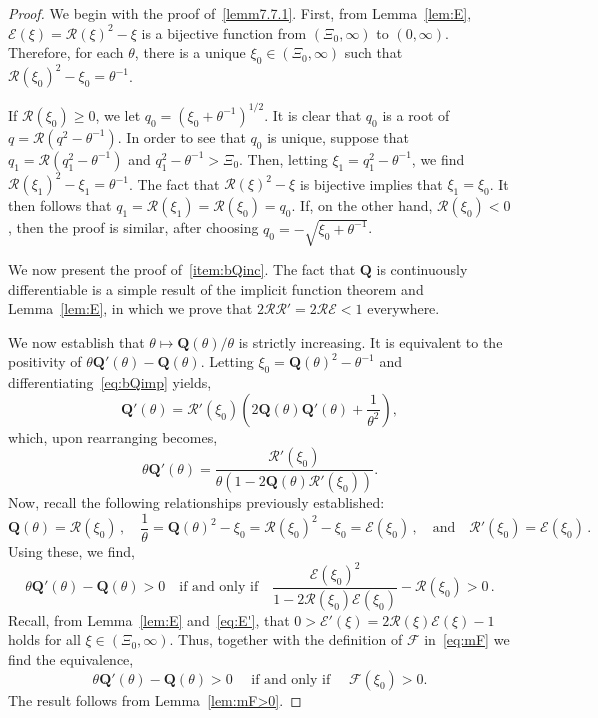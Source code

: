 \documentclass[10pt]{amsart}
\theoremstyle{definition}\newtheorem{defi}[theo]{Definition}\newtheorem{rema}[theo]{Remark}\newtheorem{exam}[theo]{Example}\newtheorem{exem}[theo]{Example}\newtheorem{nota}[theo]{Notation}
\newcommand{\bQ}{\mathbf{Q}}
\newcommand{\mE}{\mathcal{E}}
\newcommand{\mF}{\mathcal{F}}
\newcommand{\mR}{\mathcal{R}}
\newcommand{\1}{\mathds{1}}
\begin{document}
\begin{proof}
We begin with the proof of~\eqref{lemm7.7.1}. First, from Lemma~\ref{lem:E}, $\mE(\xi) = \mR(\xi)^2 - \xi$ is a bijective function from $(\Xi_0,\infty)$ to $(0,\infty)$. Therefore, for each $\theta$, there is a unique $\xi_0 \in (\Xi_0, \infty)$ such that $\mR(\xi_0)^2 - \xi_0 = \theta^{-1}$.

If $\mR(\xi_0) \geq 0$, we let $q_0 = \left (\xi_0 + \theta^{-1}\right) ^{1/2}$. It is clear that $q_0$ is a root of $q = \mR\left (q^2 - \theta^{-1}\right)$. In order to see that $q_0$ is unique, suppose that $q_1 = \mR(q_1^2 - \theta^{-1})$ and $q_1^2 - \theta^{-1}> \Xi_0$. Then, letting $\xi_1 = q_1^2 - \theta^{-1}$, we find $\mR(\xi_1)^2 - \xi_1 = \theta^{-1}$. The fact that $\mR(\xi)^2 - \xi$ is bijective implies that $\xi_1 = \xi_0$. It then follows that $q_1 = \mR(\xi_1) = \mR(\xi_0) = q_0$. If, on the other hand, $\mR(\xi_0) < 0$, then the proof is similar, after choosing $q_0 = - \sqrt{\xi_0 + \theta^{-1}}$.



We now present the proof of~\eqref{item:bQinc}. The fact that $\bQ$ is continuously differentiable is a simple result of the implicit function theorem and Lemma~\ref{lem:E}, in which we prove that $2\mR \mR' = 2\mR \mE < 1$ everywhere.

We now establish that $\theta \mapsto \bQ(\theta)/\theta$ is strictly increasing. It is equivalent to the positivity of $\theta\bQ'(\theta) - \bQ(\theta)$. Letting $\xi_0 = \bQ(\theta)^2 - \theta^{-1}$ and differentiating~\eqref{eq:bQimp} yields,
\begin{equation*}
\bQ'(\theta) = \mR'(\xi_0)\left (2 \bQ(\theta) \bQ'(\theta) + \dfrac{1}{\theta^2} \right),
\end{equation*}
which, upon rearranging becomes,
\begin{equation*}
\theta \bQ'(\theta) = \dfrac{\mR'(\xi_0)}{\theta\left (1 - 2\bQ(\theta)\mR'(\xi_0)\right)}.
\end{equation*}
Now, recall the following relationships previously established:
\begin{equation*}
\bQ(\theta) = \mR(\xi_0)\,,\quad \dfrac{1}{\theta} = \bQ(\theta)^2 - \xi_0 = \mR(\xi_0)^2 - \xi_0 = \mE(\xi_0)\,, \quad \text{and}\quad \mR'(\xi_0) = \mE(\xi_0)\,.
\end{equation*}
Using these, we find,
\begin{equation*}
\theta\bQ'(\theta) - \bQ(\theta) > 0
\quad \text{if and only if} \quad
\dfrac{\mE(\xi_0)^2}{1 - 2 \mR(\xi_0) \mE(\xi_0)} - \mR(\xi_0)> 0\,.
\end{equation*}
Recall, from Lemma~\ref{lem:E} and~\eqref{eq:E'}, that $0 > \mE'(\xi) = 2 \mR(\xi) \mE(\xi) - 1 $ holds for all $\xi\in(\Xi_0,\infty)$. Thus, together with the definition of $\mF$ in~\eqref{eq:mF} we find the equivalence,
\begin{equation*}
\theta\bQ'(\theta) - \bQ(\theta) > 0
\quad \text{ if and only if } \quad
\mF(\xi_0) > 0.
\end{equation*}
The result follows from Lemma~\ref{lem:mF>0}.




\end{proof}
\end{document}
